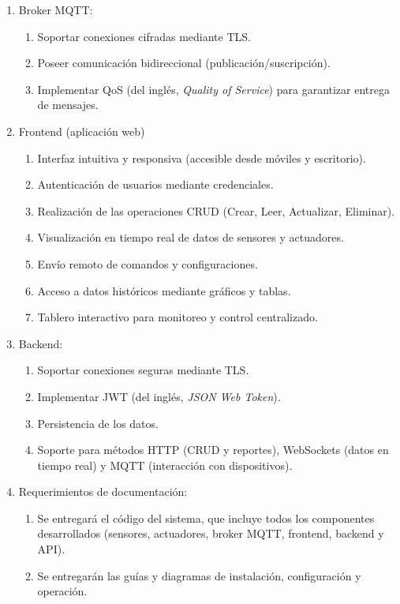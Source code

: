 \begin{enumerate}
      \item Broker MQTT:
            \begin{enumerate}
                  \item Soportar conexiones cifradas mediante TLS.
                  \item Poseer comunicación bidireccional (publicación/suscripción).
                  \item Implementar QoS (del inglés, \textit{Quality of Service}) para garantizar entrega de
                        mensajes.
            \end{enumerate}

      \item Frontend (aplicación web)
            \begin{enumerate}
                  \item Interfaz intuitiva y responsiva (accesible desde móviles y escritorio).
                  \item Autenticación de usuarios mediante credenciales.
                  \item Realización de las operaciones CRUD (Crear, Leer, Actualizar, Eliminar).
                  \item Visualización en tiempo real de datos de sensores y actuadores.
                  \item Envío remoto de comandos y configuraciones.
                  \item Acceso a datos históricos mediante gráficos y tablas.
                  \item Tablero interactivo para monitoreo y control centralizado.
            \end{enumerate}

      \item Backend:
            \begin{enumerate}
                  \item Soportar conexiones seguras mediante TLS.
                  \item Implementar JWT (del inglés, \textit{JSON Web Token}).
                  \item Persistencia de los datos.
                  \item Soporte para métodos HTTP (CRUD y reportes), WebSockets (datos en tiempo real)
                        y MQTT (interacción con dispositivos).
            \end{enumerate}

      \item Requerimientos de documentación:
            \begin{enumerate}
                  \item Se entregará el código del sistema, que incluye todos los componentes
                        desarrollados (sensores, actuadores, broker MQTT, frontend, backend y API).
                  \item Se entregarán las guías y diagramas de instalación, configuración y operación.
            \end{enumerate}
\end{enumerate}

